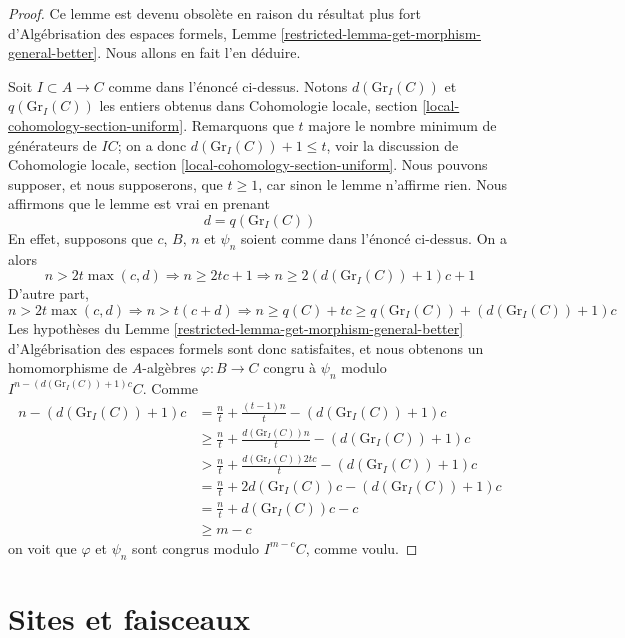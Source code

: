 \begin{proof}
Ce lemme est devenu obsol\`ete en raison du r\'esultat plus fort
d'Alg\'ebrisation des espaces formels,
Lemme \ref{restricted-lemma-get-morphism-general-better}.
Nous allons en fait l'en d\'eduire.

\medskip\noindent
Soit $I \subset A \to C$ comme dans l'\'enonc\'e ci-dessus.
Notons $d(\text{Gr}_I(C))$ et $q(\text{Gr}_I(C))$ les entiers obtenus dans
Cohomologie locale, section \ref{local-cohomology-section-uniform}.
Remarquons que $t$ majore le nombre minimum de g\'en\'erateurs de $IC$;
on a donc $d(\text{Gr}_I(C)) + 1 \leq t$, voir la discussion de
Cohomologie locale, section \ref{local-cohomology-section-uniform}.
Nous pouvons supposer, et nous supposerons, que $t \geq 1$, car sinon le lemme
n'affirme rien. Nous affirmons que le lemme est vrai en prenant
$$
d = q(\text{Gr}_I(C))
$$
En effet, supposons que $c$, $B$, $n$ et $\psi_n$ soient comme dans l'\'enonc\'e
ci-dessus. On a alors
$$
n > 2t\max(c, d) \Rightarrow n \geq 2tc + 1 \Rightarrow
n \geq 2(d(\text{Gr}_I(C)) + 1)c + 1
$$
D'autre part,
$$
n > 2t\max(c, d) \Rightarrow n > t(c + d) \Rightarrow
n \geq q(C) + tc \geq q(\text{Gr}_I(C)) + (d(\text{Gr}_I(C)) + 1)c
$$
Les hypoth\`eses du Lemme \ref{restricted-lemma-get-morphism-general-better}
d'Alg\'ebrisation des espaces formels sont donc satisfaites,
et nous obtenons un homomorphisme de $A$-alg\`ebres
$\varphi : B \to C$ congru \`a $\psi_n$
modulo $I^{n - (d(\text{Gr}_I(C)) + 1)c}C$.
Comme
\begin{align*}
n - (d(\text{Gr}_I(C)) + 1)c
& = \frac{n}{t} + \frac{(t - 1)n}{t} - (d(\text{Gr}_I(C)) + 1)c \\
& \geq \frac{n}{t} + \frac{d(\text{Gr}_I(C))n}{t} - (d(\text{Gr}_I(C)) + 1)c \\
& > \frac{n}{t} + \frac{d(\text{Gr}_I(C))2tc}{t} - (d(\text{Gr}_I(C)) + 1)c \\
& = \frac{n}{t} + 2d(\text{Gr}_I(C))c - (d(\text{Gr}_I(C)) + 1)c \\
& = \frac{n}{t} + d(\text{Gr}_I(C))c - c \\
& \geq m - c
\end{align*}
on voit que $\varphi$ et $\psi_n$ sont congrus modulo $I^{m - c}C$, comme voulu.
\end{proof}
\section{Sites et faisceaux}
\label{section-sites}

